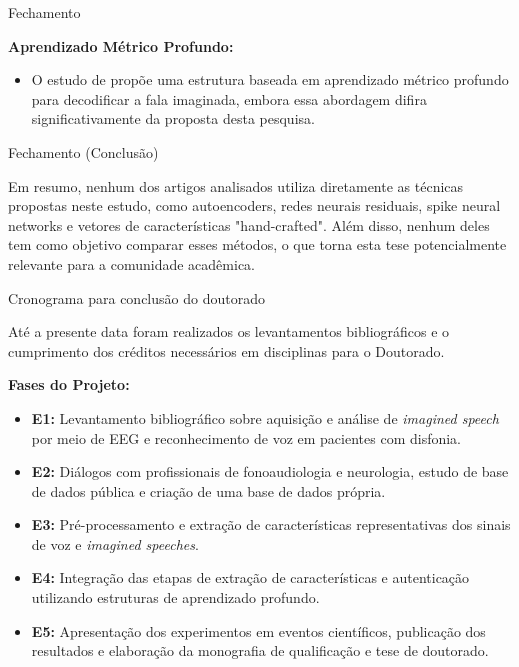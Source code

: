\documentclass{beamer}
\begin{document}
\begin{frame}[allowframebreaks]{Fechamento}
		\par \textbf{Aprendizado Métrico Profundo:}
		\begin{itemize}
			\item O estudo de \cite{lee2021decoding} propõe uma estrutura baseada em aprendizado métrico profundo para decodificar a fala imaginada, embora essa abordagem difira significativamente da proposta desta pesquisa.
		\end{itemize}
	\end{frame}
	\begin{frame}{Fechamento (Conclusão)}
		\par Em resumo, nenhum dos artigos analisados utiliza diretamente as técnicas propostas neste estudo, como autoencoders, redes neurais residuais, spike neural networks e vetores de características "hand-crafted". Além disso, nenhum deles tem como objetivo comparar esses métodos, o que torna esta tese potencialmente relevante para a comunidade acadêmica.
	\end{frame}

	\begin{frame}{Cronograma para conclusão do doutorado}
			\par Até a presente data foram realizados os levantamentos bibliográficos e o cumprimento dos créditos necessários em disciplinas para o Doutorado.
			
			\par \textbf{Fases do Projeto:}
			
			\begin{itemize}
				\item \textbf{E1:} Levantamento bibliográfico sobre aquisição e análise de \textit{imagined speech} por meio de EEG e reconhecimento de voz em pacientes com disfonia.
				\item \textbf{E2:} Diálogos com profissionais de fonoaudiologia e neurologia, estudo de base de dados pública e criação de uma base de dados própria.
				\item \textbf{E3:} Pré-processamento e extração de características representativas dos sinais de voz e \textit{imagined speeches}.
				\item \textbf{E4:} Integração das etapas de extração de características e autenticação utilizando estruturas de aprendizado profundo.
				\item \textbf{E5:} Apresentação dos experimentos em eventos científicos, publicação dos resultados e elaboração da monografia de qualificação e tese de doutorado.
			\end{itemize}
	\end{frame}
\end{document}
